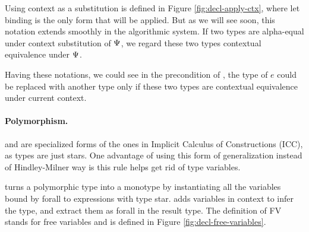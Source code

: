 Using context as a substitution is defined in Figure \ref{fig:decl-apply-ctx}, where let binding is the only form that will be applied. But as we will see soon, this notation extends smoothly in the algorithmic system. If two types are alpha-equal under context substitution of $\Psi$, we regard these two types contextual equivalence under $\Psi$.

Having these notations, we could see in the precondition of , the type of $e$ could be replaced with another type only if these two types are contextual equivalence under current context.

\paragraph{Polymorphism.}  and  are specialized forms of the ones in Implicit Calculus of Constructions (ICC), as types are just stars. One advantage of using this form of generalization instead of Hindley-Milner way is this rule helps get rid of type variables.

 turns a polymorphic type into a monotype by instantiating all the variables bound by forall to expressions with type star.  adds variables in context to infer the type, and extract them as forall in the result type. The definition of FV stands for free variables and is defined in Figure \ref{fig:decl-free-variables}.
